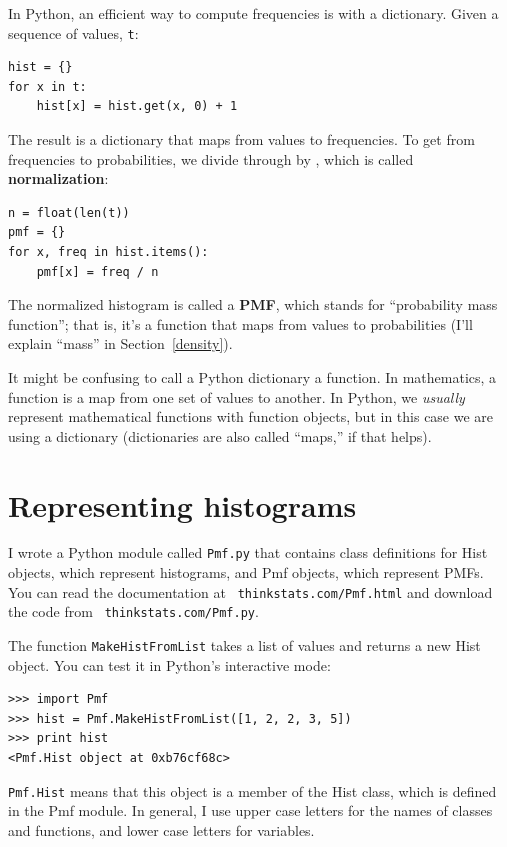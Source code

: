 \documentclass[12pt]{book}
\begin{document}
In Python, an efficient way to compute frequencies is with a dictionary.
Given a sequence of values, {\tt t}:
%
\begin{verbatim}
hist = {}
for x in t:
    hist[x] = hist.get(x, 0) + 1
\end{verbatim}

The result is a dictionary that maps from values to frequencies.
To get from frequencies to probabilities, we divide through by \n,
which is called {\bf normalization}:
%
\begin{verbatim}
n = float(len(t))
pmf = {}
for x, freq in hist.items():
    pmf[x] = freq / n
\end{verbatim}

The normalized histogram is called a {\bf PMF}, which stands for
``probability mass function''; that is, it's a function that maps from
values to probabilities (I'll explain ``mass'' in
Section~\ref{density}).

It might be confusing to call a Python dictionary a function.  In
mathematics, a function is a map from one set of values to
another.  In Python, we {\em usually} represent mathematical functions
with function objects, but in this case we are using a dictionary
(dictionaries are also called ``maps,'' if that helps).


\section{Representing histograms}

I wrote a Python module called {\tt Pmf.py} that contains class
definitions for Hist objects, which represent histograms, and Pmf
objects, which represent PMFs.  You can read the documentation at {\tt
  thinkstats.com/Pmf.html} and download the code from {\tt
  thinkstats.com/Pmf.py}.

The function {\tt MakeHistFromList} takes a list of values and
returns a new Hist object.  You can test it in Python's interactive
mode:
%
\begin{verbatim}
>>> import Pmf
>>> hist = Pmf.MakeHistFromList([1, 2, 2, 3, 5])
>>> print hist
<Pmf.Hist object at 0xb76cf68c>
\end{verbatim}

{\tt Pmf.Hist} means that this object is a member of the Hist class,
which is defined in the Pmf module.  In general, I use upper case
letters for the names of classes and functions, and lower case letters
for variables.
\end{document}
